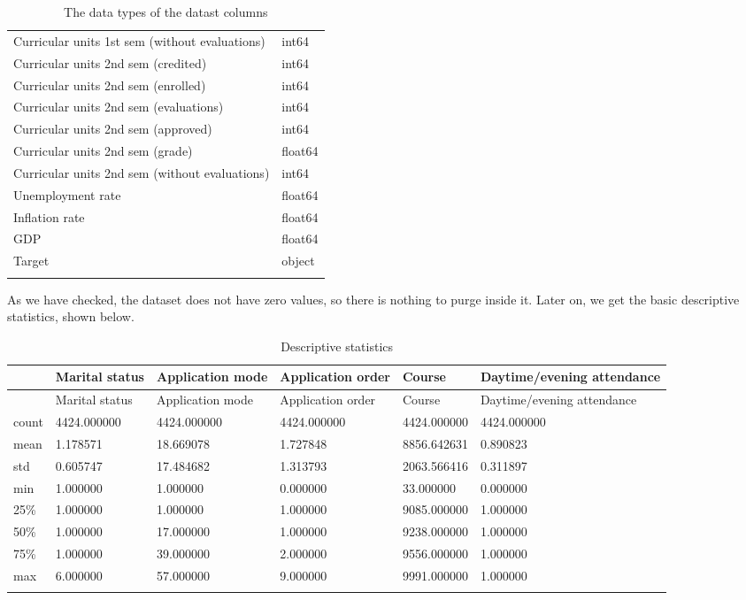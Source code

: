 \documentclass[
  letterpaper,
  DIV=11,
  numbers=noendperiod]{scrartcl}
\begin{document}
\begin{longtable}[]{@{}ll@{}}
Curricular units 1st sem (without evaluations) & int64 \\
Curricular units 2nd sem (credited) & int64 \\
Curricular units 2nd sem (enrolled) & int64 \\
Curricular units 2nd sem (evaluations) & int64 \\
Curricular units 2nd sem (approved) & int64 \\
Curricular units 2nd sem (grade) & float64 \\
Curricular units 2nd sem (without evaluations) & int64 \\
Unemployment rate & float64 \\
Inflation rate & float64 \\
GDP & float64 \\
Target & object \\
\caption{The data types of the datast columns }\tabularnewline
\end{longtable}

As we have checked, the dataset does not have zero values, so there is
nothing to purge inside it. Later on, we get the basic descriptive
statistics, shown below.

\hypertarget{tab-descstat-1}{}
\begin{longtable}[]{@{}llllll@{}}
\toprule\noalign{}
& Marital status & Application mode & Application order & Course &
Daytime/evening attendance \\
\midrule\noalign{}
\endfirsthead
\toprule\noalign{}
& Marital status & Application mode & Application order & Course &
Daytime/evening attendance \\
\midrule\noalign{}
\endhead
\bottomrule\noalign{}
\endlastfoot
count & 4424.000000 & 4424.000000 & 4424.000000 & 4424.000000 &
4424.000000 \\
mean & 1.178571 & 18.669078 & 1.727848 & 8856.642631 & 0.890823 \\
std & 0.605747 & 17.484682 & 1.313793 & 2063.566416 & 0.311897 \\
min & 1.000000 & 1.000000 & 0.000000 & 33.000000 & 0.000000 \\
25\% & 1.000000 & 1.000000 & 1.000000 & 9085.000000 & 1.000000 \\
50\% & 1.000000 & 17.000000 & 1.000000 & 9238.000000 & 1.000000 \\
75\% & 1.000000 & 39.000000 & 2.000000 & 9556.000000 & 1.000000 \\
max & 6.000000 & 57.000000 & 9.000000 & 9991.000000 & 1.000000 \\
\caption{Descriptive statistics }\tabularnewline
\end{longtable}
\end{document}
